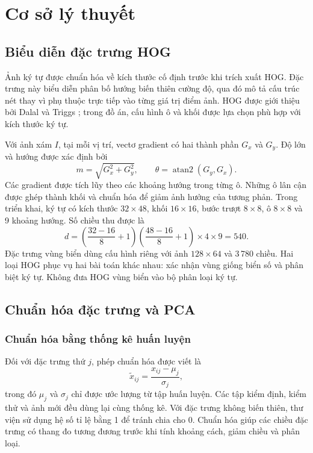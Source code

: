 \chapter{Cơ sở lý thuyết}
\section{Biểu diễn đặc trưng HOG}
Ảnh ký tự được chuẩn hóa về kích thước cố định trước khi trích xuất HOG. Đặc trưng này biểu diễn phân bố hướng biến thiên cường độ, qua đó mô tả cấu trúc nét thay vì phụ thuộc trực tiếp vào từng giá trị điểm ảnh. HOG được giới thiệu bởi Dalal và Triggs \cite{hog}; trong đồ án, cấu hình ô và khối được lựa chọn phù hợp với kích thước ký tự.

Với ảnh xám $I$, tại mỗi vị trí, vectơ gradient có hai thành phần $G_x$ và $G_y$. Độ lớn và hướng được xác định bởi
\begin{equation}
m=\sqrt{G_x^2+G_y^2},\qquad \theta=\operatorname{atan2}(G_y,G_x).
\end{equation}
Các gradient được tích lũy theo các khoảng hướng trong từng ô. Những ô lân cận được ghép thành khối và chuẩn hóa để giảm ảnh hưởng của tương phản. Trong triển khai, ký tự có kích thước $32\times48$, khối $16\times16$, bước trượt $8\times8$, ô $8\times8$ và 9 khoảng hướng. Số chiều thu được là
\begin{equation}
d=\left(\frac{32-16}{8}+1\right)
  \left(\frac{48-16}{8}+1\right)\times4\times9=540.
\end{equation}
Đặc trưng vùng biển dùng cấu hình riêng với ảnh $128\times64$ và 3\,780 chiều. Hai loại HOG phục vụ hai bài toán khác nhau: xác nhận vùng giống biển số và phân biệt ký tự. Không đưa HOG vùng biển vào bộ phân loại ký tự.

\section{Chuẩn hóa đặc trưng và PCA}
\subsection{Chuẩn hóa bằng thống kê huấn luyện}
Đối với đặc trưng thứ $j$, phép chuẩn hóa được viết là
\begin{equation}
\widetilde{x}_{ij}=\frac{x_{ij}-\mu_j}{\sigma_j},
\end{equation}
trong đó $\mu_j$ và $\sigma_j$ chỉ được ước lượng từ tập huấn luyện. Các tập kiểm định, kiểm thử và ảnh mới đều dùng lại cùng thống kê. Với đặc trưng không biến thiên, thư viện sử dụng hệ số tỉ lệ bằng 1 để tránh chia cho 0. Chuẩn hóa giúp các chiều đặc trưng có thang đo tương đương trước khi tính khoảng cách, giảm chiều và phân loại.

